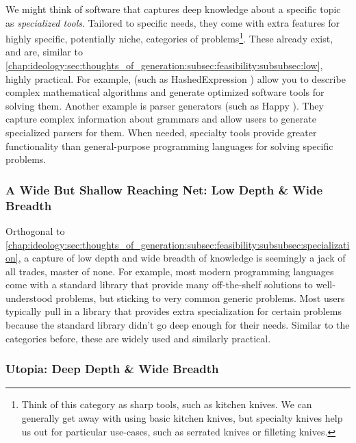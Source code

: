We might think of software that captures deep knowledge about a specific topic
as \textit{specialized tools}. Tailored to specific needs, they come with extra
features for highly specific, potentially niche, categories of
problems\footnote{Think of this category as sharp tools, such as kitchen knives.
We can generally get away with using basic kitchen knives, but specialty knives
help us out for particular use-cases, such as serrated knives or filleting
knives.}. These already exist, and are, similar to
\autoref{chap:ideology:sec:thoughts_of_generation:subsec:feasibility:subsubsec:low},
highly practical. For example,  (such as HashedExpression
\cite{HashedExpression}) allow you to describe complex mathematical algorithms
and generate optimized software tools for solving them. Another example is
parser generators (such as Happy \cite{Happy}). They capture complex information
about grammars and allow users to generate specialized parsers for them. When
needed, specialty tools provide greater functionality than general-purpose
programming languages for solving specific problems.

\subsubsection{A Wide But Shallow Reaching Net: Low Depth \& Wide Breadth}
\label{chap:ideology:sec:thoughts_of_generation:subsec:feasibility:subsubsec:modelling}

Orthogonal to
\autoref{chap:ideology:sec:thoughts_of_generation:subsec:feasibility:subsubsec:specialization},
a capture of low depth and wide breadth of knowledge is seemingly a jack of all
trades, master of none. For example, most modern programming languages come with
a standard library that provide many off-the-shelf solutions to well-understood
problems, but sticking to very common generic problems. Most users typically
pull in a library that provides extra specialization for certain problems
because the standard library didn't go deep enough for their needs. Similar to
the categories before, these are widely used and similarly practical.

\subsubsection{Utopia: Deep Depth \& Wide Breadth}
\label{chap:ideology:sec:thoughts_of_generation:subsec:feasibility:subsubsec:utopia}

